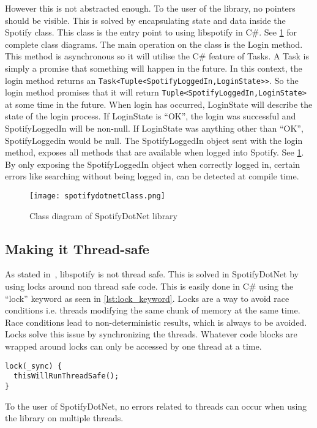 However this is not abstracted enough. To the user of the library, no pointers should be visible. This is solved by encapsulating state and data inside the Spotify class. This class is the entry point to using libspotify in C\#. See \cref{fig:spotifydotnet_class} for complete class diagrams. The main operation on the class is the Login method. This method is asynchronous so it will utilise the C\# feature of Tasks. A Task is simply a promise that something will happen in the future. In this context, the login method returns an \lstinline|Task<Tuple<SpotifyLoggedIn,LoginState>>|. So the login method promises that it will return \lstinline|Tuple<SpotifyLoggedIn,LoginState>| at some time in the future. When login has occurred, LoginState will describe the state of the login process. If LoginState is \enquote{OK}, the login was successful and SpotifyLoggedIn will be non-null. If LoginState was anything other than \enquote{OK}, SpotifyLoggedin would be null. The SpotifyLoggedIn object sent with the login method, exposes all methods that are available when logged into Spotify. See \cref{fig:spotifydotnet_class}. By only exposing the SpotifyLoggedIn object when correctly logged in, certain errors like searching without being logged in, can be detected at compile time.

\begin{figure}[hbtp]
  \centering
  \texttt{[image: spotifydotnetClass.png]}
  \caption{Class diagram of SpotifyDotNet library}
  \label{fig:spotifydotnet_class}
\end{figure}

\subsection{Making it Thread-safe}
\label{libspotify:making_it_thread_safe}

As stated in~\cite{spotifyLibspotifyFAQ}, libspotify is not thread safe. This is solved in SpotifyDotNet by using locks around non thread safe code. This is easily done in C\# using the \enquote{lock} keyword as seen in \cref{lst:lock_keyword}. Locks are a way to avoid race conditions i.e. threads modifying the same chunk of memory at the same time. Race conditions lead to non-deterministic results, which is always to be avoided. Locks solve this issue by synchronizing the threads. Whatever code blocks are wrapped around locks can only be accessed by one thread at a time.

\begin{lstlisting}[float, floatplacement=htpb, caption = {Example of using the lock keyword in C\#. \enquote{\_sync} is an object used to store the lock state}, label = {lst:lock_keyword}]
lock(_sync) {
  thisWillRunThreadSafe();
}
\end{lstlisting}

To the user of SpotifyDotNet, no errors related to threads can occur when using the library on multiple threads.

